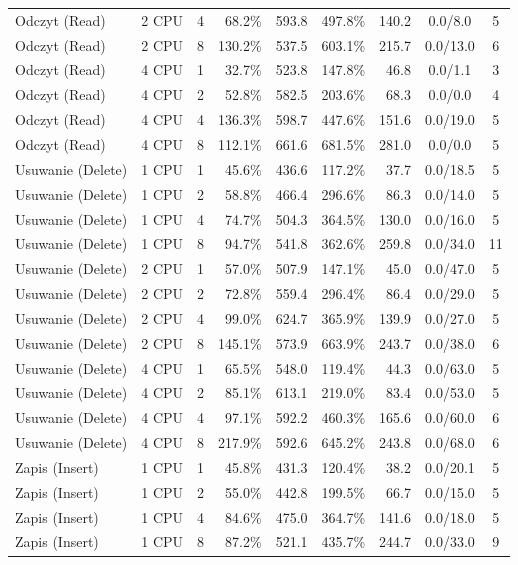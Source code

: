 \begin{table}[ht]
{\begin{tabular}{llcrrrrcc}
Odczyt (Read) & 2 CPU & 4 & 68.2\% & 593.8 & 497.8\% & 140.2 & 0.0/8.0 & 5 \\
Odczyt (Read) & 2 CPU & 8 & 130.2\% & 537.5 & 603.1\% & 215.7 & 0.0/13.0 & 6 \\
Odczyt (Read) & 4 CPU & 1 & 32.7\% & 523.8 & 147.8\% & 46.8 & 0.0/1.1 & 3 \\
Odczyt (Read) & 4 CPU & 2 & 52.8\% & 582.5 & 203.6\% & 68.3 & 0.0/0.0 & 4 \\
Odczyt (Read) & 4 CPU & 4 & 136.3\% & 598.7 & 447.6\% & 151.6 & 0.0/19.0 & 5 \\
Odczyt (Read) & 4 CPU & 8 & 112.1\% & 661.6 & 681.5\% & 281.0 & 0.0/0.0 & 5 \\
Usuwanie (Delete) & 1 CPU & 1 & 45.6\% & 436.6 & 117.2\% & 37.7 & 0.0/18.5 & 5 \\
Usuwanie (Delete) & 1 CPU & 2 & 58.8\% & 466.4 & 296.6\% & 86.3 & 0.0/14.0 & 5 \\
Usuwanie (Delete) & 1 CPU & 4 & 74.7\% & 504.3 & 364.5\% & 130.0 & 0.0/16.0 & 5 \\
Usuwanie (Delete) & 1 CPU & 8 & 94.7\% & 541.8 & 362.6\% & 259.8 & 0.0/34.0 & 11 \\
Usuwanie (Delete) & 2 CPU & 1 & 57.0\% & 507.9 & 147.1\% & 45.0 & 0.0/47.0 & 5 \\
Usuwanie (Delete) & 2 CPU & 2 & 72.8\% & 559.4 & 296.4\% & 86.4 & 0.0/29.0 & 5 \\
Usuwanie (Delete) & 2 CPU & 4 & 99.0\% & 624.7 & 365.9\% & 139.9 & 0.0/27.0 & 5 \\
Usuwanie (Delete) & 2 CPU & 8 & 145.1\% & 573.9 & 663.9\% & 243.7 & 0.0/38.0 & 6 \\
Usuwanie (Delete) & 4 CPU & 1 & 65.5\% & 548.0 & 119.4\% & 44.3 & 0.0/63.0 & 5 \\
Usuwanie (Delete) & 4 CPU & 2 & 85.1\% & 613.1 & 219.0\% & 83.4 & 0.0/53.0 & 5 \\
Usuwanie (Delete) & 4 CPU & 4 & 97.1\% & 592.2 & 460.3\% & 165.6 & 0.0/60.0 & 6 \\
Usuwanie (Delete) & 4 CPU & 8 & 217.9\% & 592.6 & 645.2\% & 243.8 & 0.0/68.0 & 6 \\
Zapis (Insert) & 1 CPU & 1 & 45.8\% & 431.3 & 120.4\% & 38.2 & 0.0/20.1 & 5 \\
Zapis (Insert) & 1 CPU & 2 & 55.0\% & 442.8 & 199.5\% & 66.7 & 0.0/15.0 & 5 \\
Zapis (Insert) & 1 CPU & 4 & 84.6\% & 475.0 & 364.7\% & 141.6 & 0.0/18.0 & 5 \\
Zapis (Insert) & 1 CPU & 8 & 87.2\% & 521.1 & 435.7\% & 244.7 & 0.0/33.0 & 9 \\

\end{tabular}}
\end{table}
